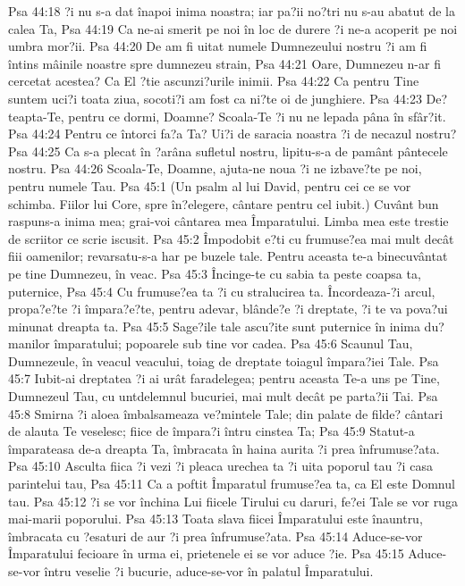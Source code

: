 Psa 44:18  ?i nu s-a dat înapoi inima noastra; iar pa?ii no?tri nu s-au abatut de la calea Ta,
Psa 44:19  Ca ne-ai smerit pe noi în loc de durere ?i ne-a acoperit pe noi umbra mor?ii.
Psa 44:20  De am fi uitat numele Dumnezeului nostru ?i am fi întins mâinile noastre spre dumnezeu strain,
Psa 44:21  Oare, Dumnezeu n-ar fi cercetat acestea? Ca El ?tie ascunzi?urile inimii.
Psa 44:22  Ca pentru Tine suntem uci?i toata ziua, socoti?i am fost ca ni?te oi de junghiere.
Psa 44:23  De?teapta-Te, pentru ce dormi, Doamne? Scoala-Te ?i nu ne lepada pâna în sfâr?it.
Psa 44:24  Pentru ce întorci fa?a Ta? Ui?i de saracia noastra ?i de necazul nostru?
Psa 44:25  Ca s-a plecat în ?arâna sufletul nostru, lipitu-s-a de pamânt pântecele nostru.
Psa 44:26  Scoala-Te, Doamne, ajuta-ne noua ?i ne izbave?te pe noi, pentru numele Tau.
Psa 45:1  (Un psalm al lui David, pentru cei ce se vor schimba. Fiilor lui Core, spre în?elegere, cântare pentru cel iubit.) Cuvânt bun raspuns-a inima mea; grai-voi cântarea mea Împaratului. Limba mea este trestie de scriitor ce scrie iscusit.
Psa 45:2  Împodobit e?ti cu frumuse?ea mai mult decât fiii oamenilor; revarsatu-s-a har pe buzele tale. Pentru aceasta te-a binecuvântat pe tine Dumnezeu, în veac.
Psa 45:3  Încinge-te cu sabia ta peste coapsa ta, puternice,
Psa 45:4  Cu frumuse?ea ta ?i cu stralucirea ta. Încordeaza-?i arcul, propa?e?te ?i împara?e?te, pentru adevar, blânde?e ?i dreptate, ?i te va pova?ui minunat dreapta ta.
Psa 45:5  Sage?ile tale ascu?ite sunt puternice în inima du?manilor împaratului; popoarele sub tine vor cadea.
Psa 45:6  Scaunul Tau, Dumnezeule, în veacul veacului, toiag de dreptate toiagul împara?iei Tale.
Psa 45:7  Iubit-ai dreptatea ?i ai urât faradelegea; pentru aceasta Te-a uns pe Tine, Dumnezeul Tau, cu untdelemnul bucuriei, mai mult decât pe parta?ii Tai.
Psa 45:8  Smirna ?i aloea îmbalsameaza ve?mintele Tale; din palate de filde? cântari de alauta Te veselesc; fiice de împara?i întru cinstea Ta;
Psa 45:9  Statut-a împarateasa de-a dreapta Ta, îmbracata în haina aurita ?i prea înfrumuse?ata.
Psa 45:10  Asculta fiica ?i vezi ?i pleaca urechea ta ?i uita poporul tau ?i casa parintelui tau,
Psa 45:11  Ca a poftit Împaratul frumuse?ea ta, ca El este Domnul tau.
Psa 45:12  ?i se vor închina Lui fiicele Tirului cu daruri, fe?ei Tale se vor ruga mai-marii poporului.
Psa 45:13  Toata slava fiicei Împaratului este înauntru, îmbracata cu ?esaturi de aur ?i prea înfrumuse?ata.
Psa 45:14  Aduce-se-vor Împaratului fecioare în urma ei, prietenele ei se vor aduce ?ie.
Psa 45:15  Aduce-se-vor întru veselie ?i bucurie, aduce-se-vor în palatul Împaratului.
